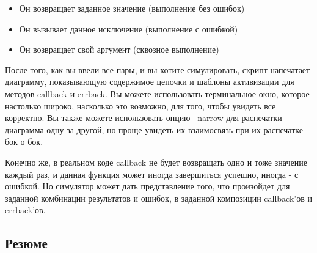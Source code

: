\begin{itemize}

\item Он возвращает заданное значение (выполнение без ошибок)

\item Он вызывает данное исключение (выполнение с ошибкой)

\item Он возвращает свой аргумент (сквозное выполнение)

\end{itemize}


После того, как вы ввели все пары, и вы хотите 
симулировать, скрипт напечатает диаграмму, показывающую 
содержимое цепочки и шаблоны активизации для методов 
callback и errback. Вы можете использовать терминальное 
окно, которое настолько широко, насколько это возможно, 
для того, чтобы увидеть все корректно. Вы также можете 
использовать опцию --narrow для распечатки диаграмма 
одну за другой, но проще увидеть их взаимосвязь при их 
распечатке бок о бок. 


Конечно же, в реальном коде callback не будет 
возвращать одно и тоже значение каждый раз, и 
данная функция может иногда завершиться успешно, 
иногда - с ошибкой. Но симулятор может дать 
представление того, что произойдет для 
заданной комбинации результатов и ошибок, в заданной 
композиции callback'ов и errback'ов.


\subsection{Резюме}

